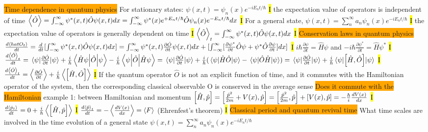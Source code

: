 \documentclass[fontsize=4pt]{scrartcl}
\begin{document}
\colorbox{Orange}{Time dependence in quantum physics}
For stationary states: $\psi(x,t) = \psi_n (x) e^{-iE_n t / \hbar}$
\hl{I}
the expectation value of operators is independent of time
$\expval{\hat{O}} = \int_{-\infty}^{\infty} \psi^{*}(x,t)\hat{O}\psi(x,t) dx = \int_{-\infty}^{\infty} \psi^{*}(x) e^{+ E_n t / \hbar} \hat{O}\psi_n(x) e^{- E_n t / \hbar}  dx $
\hl{I}
For a general state, $\psi(x,t) = \sum_{n}^{\infty} a_n \psi_n (x) e^{-iE_n t / \hbar}$
\hl{I}
the expectation value of operators is generally dependent on time
\hl{I}
$\expval{\hat{O}}_t = \int_{-\infty}^{\infty} \psi^{*}(x,t)\hat{O}\psi(x,t)dx$
\hl{I}
\colorbox{Orange}{Conservation laws in quantum physics}
$\frac{d \expval{hat{O}_t}}{dt} = \frac{d}{dt}[\int_{-\infty}^{\infty} \psi^{*}(x,t)\hat{O}\psi(x,t)dx ] = \int_{-\infty}^{\infty} \psi^{*}(x,t) \frac{\partial \hat{O}}{\partial t} \psi(x,t)dx + [\int_{-\infty}^{\infty} [ \frac{\partial \psi^{*}}{\partial t} \hat{O} \psi +   \psi^* \hat{O}  \frac{\partial \psi}{\partial t} ] dx ] $
\hl{I}
$i\hbar \frac{\partial \psi}{\partial t} = \hat{H} \psi$ and $-i\hbar \frac{\partial \psi^*}{\partial t} = \hat{H} \psi^*$
\hl{I}
$\frac{d\expval{\hat{O}}_t}{dt} = \expval{\frac{\partial \hat{O}}{\partial t}}{\psi} + \frac{i}{\hbar}\mel{\hat{H} \psi}{\hat{O}}{\psi} - \frac{i}{\hbar}\mel{\psi}{\hat{O}}{\hat{H} \psi} = \expval{\frac{\partial \hat{O}}{\partial t}}{\psi} + \frac{i}{\hbar}(\expval{\hat{H}\hat{O}}{\psi} - \expval{\hat{O}\hat{H}}{\psi}) =  \expval{\frac{\partial \hat{O}}{\partial t}}{\psi} + \frac{i}{\hbar} \expval{\comm{\hat{H}}{\hat{O}}}{\psi}  $
\hl{I}
$\frac{d\expval{\hat{O}}_t}{dt} = \expval{\frac{\partial \hat{O}}{\partial t}} + \frac{i}{\hbar} \expval{\comm{\hat{H}}{\hat{O}}}$
\hl{I}
If the quantum operator $\hat{O}$ is not an explicit function of time, and it commutes with the Hamiltonian operator of the system, then the corresponding classical observable O is conserved in the average sense
\colorbox{Orange}{Does it commute with the Hamiltonian}
example 1: between  Hamiltonian and momentum
$\comm{\hat{H}}{\hat{p}} = \comm{\frac{\hat{p}^2}{2m}+V(x)}{\hat{p}} = \comm{\frac{\hat{p}^2}{2m}}{\hat{p}} + \comm{V(x)}{\hat{p}} = - \frac{\hbar}{i}\frac{dV(x)}{dx}$
\hl{I}
$\frac{d\expval{\hat{p}_t}}{dt} = 0 + \frac{i}{\hbar}\expval{\comm{\hat{H}}{\hat{p}}}$
\hl{I}
$\frac{d\expval{\hat{p}}_t}{dt} = -\expval{\frac{dV(x)}{dx}} = \expval{F} $ (Ehrenfest's theorem)
\hl{I}
\colorbox{Orange}{Classical period and quantum revival time}
What time scales are involved in the time evolution of a general state $\psi(x,t) = \sum_{n}^{\infty} a_n \psi_n (x) e^{-iE_n t / \hbar}$
\end{document}
